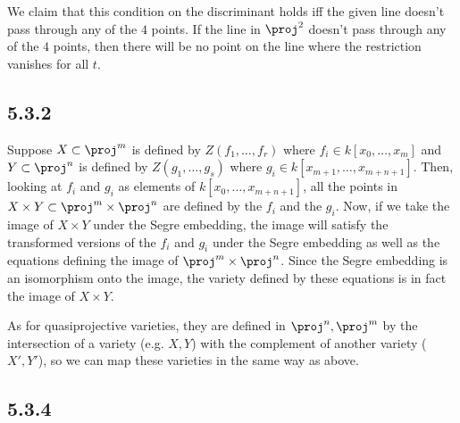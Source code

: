\documentclass{article}
\begin{document}
We claim that this condition on the discriminant holds iff the given line doesn't pass through any of the $4$ points. If the line in $\proj^2$ doesn't pass through any of the $4$ points, then there will be no point on the line where the restriction vanishes for all $t$. 
\subsection*{5.3.2}
Suppose $X\subset \proj^m$ is defined by $Z(f_1,\ldots,f_r)$ where $f_i\in k[x_0,\ldots,x_m]$ and $Y\subset \proj^n$ is defined by $Z(g_1,\ldots,g_s)$ where $g_i\in k[x_{m+1},\ldots,x_{m+n+1}]$. Then, looking at $f_i$ and $g_i$ as elements of $k[x_0,\ldots,x_{m+n+1}]$, all the points in $X\times Y\subset \proj^m\times\proj^n$ are defined by the $f_i$ and the $g_i$. Now, if we take the image of $X\times Y$ under the Segre embedding, the image will satisfy the transformed versions of the $f_i$ and $g_i$ under the Segre embedding as well as the equations defining the image of $\proj^m\times\proj^n$. Since the Segre embedding is an isomorphism onto the image, the variety defined by these equations is in fact the image of $X\times Y$.

As for quasiprojective varieties, they are defined in $\proj^n,\proj^m$ by the intersection of a variety (e.g. $X,Y$) with the complement of another variety ($X',Y'$), so we can map these varieties in the same way as above.
\subsection*{5.3.4}

\end{document}
